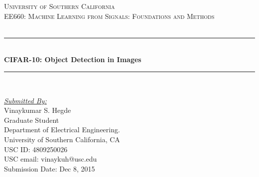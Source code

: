 \begin{titlepage}
\begin{center}


\textsc{\LARGE University of Southern California}\\[1.5cm]

\textsc{ EE660: Machine Learning from Signals: Foundations and Methods}\\[0.5cm]

~\\[2cm]
\hrule
~\\[0.2cm]
{ \LARGE \bfseries CIFAR-10: Object Detection in Images\\[0.4cm] }
\hrule
~\\[3.5cm]

\noindent
\begin{minipage}{0.9\textwidth}
\begin{flushleft} \large
\emph{\underline{Submitted By:}}\\
Vinaykumar S. Hegde\\
Graduate Student\\
Department of Electrical Engineering.\\
University of Southern California, CA\\
USC ID: 4809250026\\
USC email: vinaykuh@usc.edu\\
Submission Date: Dec 8, 2015 \\
\end{flushleft}
\end{minipage}%
\begin{minipage}{0.55\textwidth}
\end{minipage}

\vfill


\end{center}
\end{titlepage}